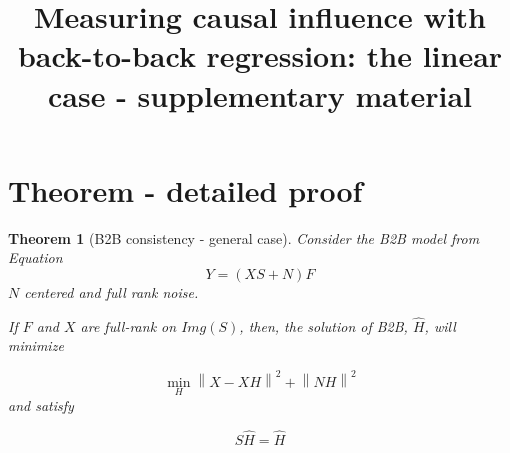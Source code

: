 \documentclass{article}
\title{Measuring causal influence with\\ back-to-back regression: the linear case - supplementary material}
\newtheorem{theorem}{Theorem}
\begin{document}
\appendix

\maketitle


\section{Theorem - detailed proof}
\label{sec:theorem}

\begin{theorem}[B2B consistency - general case]

     Consider the B2B model from Equation $$Y = (XS + N)F$$ $N$ centered and full rank noise.

     If $F$ and $X$ are full-rank on $Img(S)$, then, the solution of B2B, $\hat H$, will minimize

     $$\min_H  \left \| X - XH\right\| ^2  + \left \| NH\right \| ^2$$ and satisfy

     $$S\hat H = \hat H$$
\end{theorem}
\end{document}
